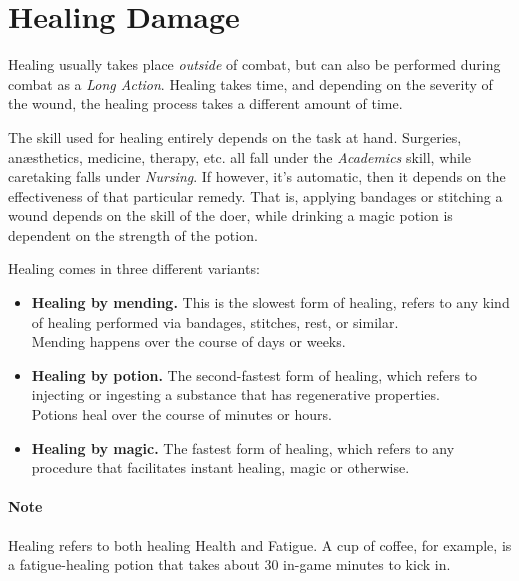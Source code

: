 \section{Healing Damage}
Healing usually takes place \textit{outside} of combat, but can also be performed during combat as a \textit{Long Action}.
Healing takes time, and depending on the severity of the wound, the healing process takes a different amount of time.

The skill used for healing entirely depends on the task at hand.
Surgeries, anæsthetics, medicine, therapy, etc. all fall under the \textit{Academics} skill, while caretaking falls under \textit{Nursing}.
If however, it's automatic, then it depends on the effectiveness of that particular remedy.
That is, applying bandages or stitching a wound depends on the skill of the doer, while drinking a magic potion is dependent on the strength of the potion.

Healing comes in three different variants:

\begin{center}
  \begin{itemize}
  \item \textbf{Healing by mending.}
    This is the slowest form of healing, refers to any kind of healing performed via bandages, stitches, rest, or similar.\\
    Mending happens over the course of days or weeks.
  \item \textbf{Healing by potion.}
    The second-fastest form of healing, which refers to injecting or ingesting a substance that has regenerative properties. \\
    Potions heal over the course of minutes or hours.
  \item \textbf{Healing by magic.}
    The fastest form of healing, which refers to any procedure that facilitates instant healing, magic or otherwise.
  \end{itemize}
\end{center}

\paragraph{Note} Healing refers to both healing Health and Fatigue.
A cup of coffee, for example, is a fatigue-healing potion that takes about 30 in-game minutes to kick in.
